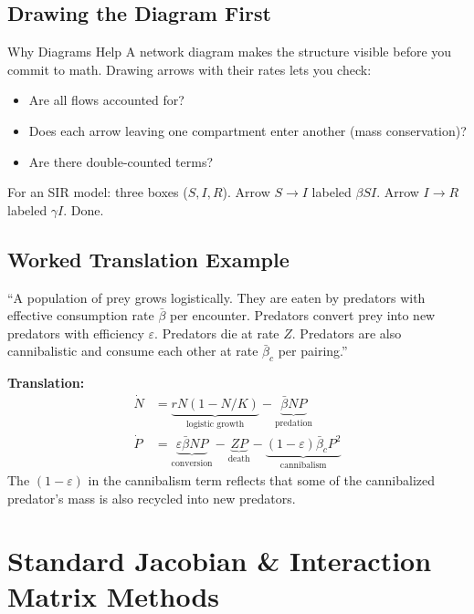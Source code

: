 \documentclass[11pt]{article}
\begin{document}
\subsection{Drawing the Diagram First}

\begin{intuitionbox}{Why Diagrams Help}
A network diagram makes the structure visible before you commit to math. Drawing arrows with their rates lets you check:
\begin{itemize}
\item Are all flows accounted for?
\item Does each arrow leaving one compartment enter another (mass conservation)?
\item Are there double-counted terms?
\end{itemize}
For an SIR model: three boxes ($S, I, R$). Arrow $S \to I$ labeled $\beta SI$. Arrow $I \to R$ labeled $\gamma I$. Done.
\end{intuitionbox}

\subsection{Worked Translation Example}

``A population of prey grows logistically. They are eaten by predators with effective consumption rate $\bar\beta$ per encounter. Predators convert prey into new predators with efficiency $\varepsilon$. Predators die at rate $Z$. Predators are also cannibalistic and consume each other at rate $\bar\beta_c$ per pairing.''

\textbf{Translation:}
\begin{align*}
\dot N &= \underbrace{rN(1 - N/K)}_{\text{logistic growth}} - \underbrace{\bar\beta NP}_{\text{predation}}\\
\dot P &= \underbrace{\varepsilon\bar\beta NP}_{\text{conversion}} - \underbrace{ZP}_{\text{death}} - \underbrace{(1-\varepsilon)\bar\beta_c P^2}_{\text{cannibalism}}
\end{align*}
The $(1-\varepsilon)$ in the cannibalism term reflects that some of the cannibalized predator's mass is also recycled into new predators.

\section{Standard Jacobian \& Interaction Matrix Methods}
\end{document}
